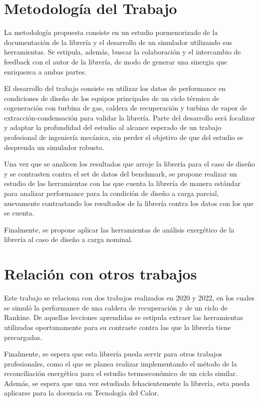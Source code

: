 \documentclass[a4paper]{article}
\begin{document}
\section*{Metodología del Trabajo}

La metodología propuesta consiste en un estudio pormenorizado de la documentación de la librería y el desarrollo de un simulador utilizando sus herramientas. Se estipula, además, buscar la colaboración y el intercambio de feedback con el autor de la librería, de modo de generar una sinergia que enriquezca a ambas partes.

El desarrollo del trabajo consiste en utilizar los datos de performance en condiciones de diseño de los equipos principales de un ciclo térmico de cogeneración con turbina de gas, caldera de recuperación y turbina de vapor de extracción-condensación para validar la librería. Parte del desarrollo será focalizar y adaptar la profundidad del estudio al alcance esperado de un trabajo profesional de ingeniería mecánica, sin perder el objetivo de que del estudio se desprenda un simulador robusto.

Una vez que se analicen los resultados que arroje la librería para el caso de diseño y se contrasten contra el set de datos del benchmark, se propone realizar un estudio de las herramientas con las que cuenta la librería de manera estándar para analizar performance para la condición de diseño a carga parcial, nuevamente contrastando los resultados de la librería contra los datos con los que se cuenta.

Finalmente, se propone aplicar las herramientas de análisis exergético de la librería al caso de diseño a carga nominal.

\section*{Relación con otros trabajos}

Este trabajo se relaciona con dos trabajos realizados en 2020 y 2022, en los cuales se simuló la performance de una caldera de recuperación y de un ciclo de Rankine. De aquellas lecciones aprendidas se estipula extraer las herramientas utilizadas oportunamente para su contraste contra las que la librería tiene precargadas.

Finalmente, se espera que esta librería pueda servir para otros trabajos profesionales, como el que se planea realizar implementando el método de la reconciliación energética para el estudio termoeconómico de un ciclo similar. Además, se espera que una vez estudiada fehacientemente la librería, esta pueda aplicarse para la docencia en Tecnología del Calor.
\end{document}
